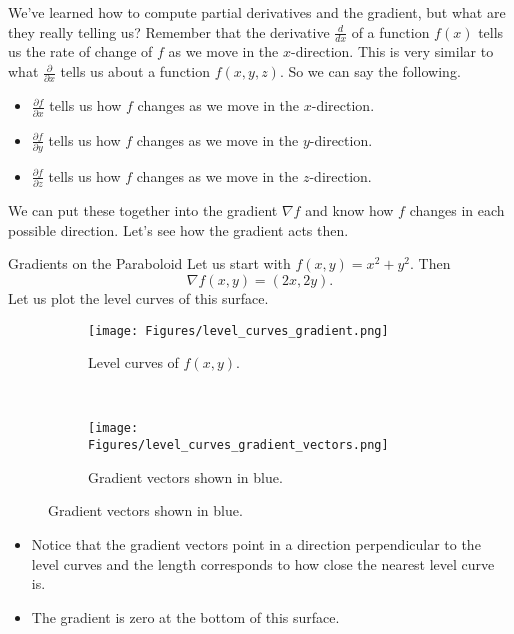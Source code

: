         We've learned how to compute partial derivatives and the gradient, but what are they really telling us? Remember that the derivative $\frac{d}{dx}$ of a function $f(x)$ tells us the rate of change of $f$ as we move in the $x$-direction.  This is very similar to what $\frac{\partial}{\partial x}$ tells us about a function $f(x,y,z)$.  So we can say the following.
        \begin{itemize}
            \item $\frac{\partial f}{\partial x}$ tells us how $f$ changes as we move in the $x$-direction.
            \item $\frac{\partial f}{\partial y}$ tells us how $f$ changes as we move in the $y$-direction.
            \item $\frac{\partial f}{\partial z}$ tells us how $f$ changes as we move in the $z$-direction.
        \end{itemize}
        
        We can put these together into the gradient $\nabla f$ and know how $f$ changes in each possible direction. Let's see how the gradient acts then. 
        
        \begin{ex}{Gradients on the Paraboloid}
        Let us start with $f(x,y)=x^2+y^2$.  Then
        \[
        \nabla f(x,y) = (2x,2y).
        \]
        Let us plot the level curves of this surface.
        \begin{figure}[H]
            \centering
            \begin{subfigure}[h]{.45\textwidth}
            \texttt{[image: Figures/level\_curves\_gradient.png]}
            \caption{Level curves of $f(x,y)$.}
            \end{subfigure}
            ~
            \begin{subfigure}[h]{.45\textwidth}
            \texttt{[image: Figures/level\_curves\_gradient\_vectors.png]}
            \caption{Gradient vectors shown in blue.}
            \end{subfigure}
        \end{figure}
        \begin{itemize}
            \item Notice that the gradient vectors point in a direction perpendicular to the level curves and the length corresponds to how close the nearest level curve is.
            \item The gradient is zero at the bottom of this surface.  
        \end{itemize}
        \end{ex}
        
